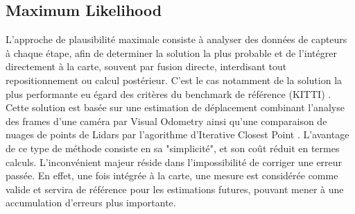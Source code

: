 \documentclass[twoside,twocolumn]{article}
\begin{document}
\subsection{Maximum Likelihood}
L'approche de plausibilité maximale consiste à analyser des données de capteurs à chaque étape, afin de determiner la solution la plus probable et de l'intégrer directement à la carte, souvent par fusion directe, interdisant tout
repositionnement ou calcul postérieur. C'est le cas notamment de la solution la plus performante \cite{zhang_visual-lidar_2015}
eu égard des critères du benchmark de référence (KITTI) \cite{_kitti_????}. Cette solution est basée sur une estimation de déplacement combinant l'analyse des frames d'une caméra par Visual Odometry \cite{nister_visual_2004} ainsi qu'une comparaison de nuages de points de Lidars par l'agorithme d'Iterative Closest Point \cite{pomerleau_review_2015}. L'avantage de ce type de méthode consiste en sa "simplicité", et son coût réduit en termes calculs. L'inconvénient majeur réside dans l'impossibilité de corriger une erreur passée.
En effet, une fois intégrée à la carte, une mesure est considérée comme valide et servira de référence pour les estimations futures, pouvant mener à une accumulation d'erreurs plus importante.
\end{document}
